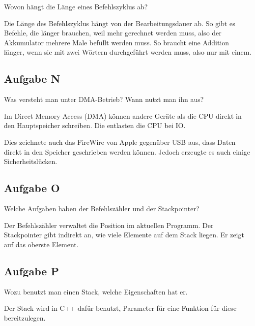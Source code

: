 \begin{problem}
	Wovon hängt die Länge eines Befehlszyklus ab?
\end{problem}

Die Länge des Befehlszyklus hängt von der Bearbeitungsdauer ab. So gibt es
Befehle, die länger brauchen, weil mehr gerechnet werden muss, also der
Akkumulator mehrere Male befüllt werden muss. So braucht eine Addition länger,
wenn sie mit zwei Wörtern durchgeführt werden muss, also nur mit einem.

\subsection{Aufgabe N}

\begin{problem}
	Was versteht man unter DMA-Betrieb? Wann nutzt man ihn aus?
\end{problem}

Im Direct Memory Access (DMA) können andere Geräte als die CPU direkt in den
Hauptspeicher schreiben. Die entlasten die CPU bei IO.
\cite{glossarwiki/direct_memory_access}

Dies zeichnete auch das FireWire von Apple gegenüber USB aus, dass Daten direkt
in den Speicher geschrieben werden können. Jedoch erzeugte es auch einige
Sicherheitslücken. \cite{wikipedia/DMA_attack,herman/dma}

\subsection{Aufgabe O}

\begin{problem}
	Welche Aufgaben haben der Befehlszähler und der Stackpointer?
\end{problem}

Der Befehlszähler verwaltet die Position im aktuellen Programm. Der
Stackpointer gibt indirekt an, wie viele Elemente auf dem Stack liegen. Er
zeigt auf das oberste Element.

\subsection{Aufgabe P}

\begin{problem}
	Wozu benutzt man einen Stack, welche Eigenschaften hat er.
\end{problem}

Der Stack wird in C++ dafür benutzt, Parameter für eine Funktion für diese
bereitzulegen.

